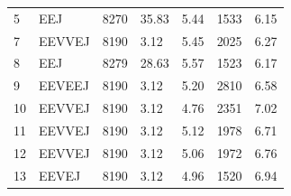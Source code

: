 \documentclass[letterpaper, paper,11pt]{AAS}	%
\begin{document}
\begin{table}[h!]
\begin{tabular}{lllllll}
        5                           & EEJ                        & 8270                            & 35.83                                                  & 5.44                                                    & 1533                       & 6.15                                                             \\
        7                           & EEVVEJ                     & 8190                            & 3.12                                                   & 5.45                                                    & 2025                       & 6.27                                                             \\
        8                           & EEJ                        & 8279                            & 28.63                                                  & 5.57                                                    & 1523                       & 6.17                                                             \\
        \rowcolor{lightgray}9       & EEVEEJ                     & 8190                            & 3.12                                                   & 5.20                                                    & 2810                       & 6.58                                                             \\
        10                          & EEVVEJ                     & 8190                            & 3.12                                                   & 4.76                                                    & 2351                       & 7.02                                                             \\
        11                          & EEVVEJ                     & 8190                            & 3.12                                                   & 5.12                                                    & 1978                       & 6.71                                                             \\
        12                          & EEVVEJ                     & 8190                            & 3.12                                                   & 5.06                                                    & 1972                       & 6.76                                                             \\
        13                          & EEVEJ                      & 8190                            & 3.12                                                   & 4.96                                                    & 1520                       & 6.94                                                             \\

\end{tabular}
\end{table}
\end{document}
